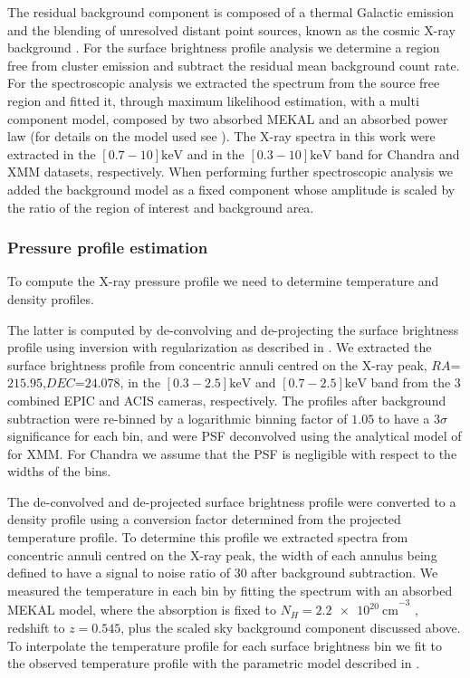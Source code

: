 \documentclass[twocolumn,traditabstract]{aa}
\begin{document}
The residual background component is composed of a thermal Galactic emission \citep{snowden1995} and the blending of unresolved distant point sources, known as the cosmic X-ray background \citep{giacconi2001}. For the surface brightness profile analysis we determine a region free from cluster emission and subtract the residual mean background count rate. For the spectroscopic analysis we extracted the spectrum from the source free region and fitted it, through maximum likelihood estimation, with a multi component model, composed by two absorbed MEKAL and an absorbed power law (for details on the model used see \citealt{pratt2009}). The X-ray spectra in this work were extracted in the $[0.7-10]\si{\kilo\electronvolt}$ and in the $[0.3-10]\si{\kilo\electronvolt}$ band for Chandra and XMM datasets, respectively. When performing further spectroscopic analysis we added the background model as a fixed component whose amplitude is scaled by the ratio of the region of interest and background area.

\subsubsection{Pressure profile estimation}
To compute the X-ray pressure profile we need to determine temperature and density profiles. 

The latter is computed by de-convolving and de-projecting the surface brightness profile using inversion with regularization as described in \cite{croston2006}. We extracted the surface brightness profile from concentric annuli centred on the X-ray peak, $RA$=$215.95$,$DEC$=$24.078$, in the $[0.3-2.5]\si{\kilo\electronvolt}$ and $[0.7-2.5]\si{\kilo\electronvolt}$ band from the $3$ combined EPIC and ACIS cameras, respectively. The profiles after background subtraction were re-binned by a logarithmic binning factor of $1.05$ to have a $3\sigma$ significance for each bin, and were PSF deconvolved using the analytical model of \cite{ghizzardi2001} for XMM. For Chandra we assume that the PSF is negligible with respect to 
the widths of the bins. 

The de-convolved and de-projected surface brightness profile were converted to a density profile using a conversion factor determined from the projected temperature profile. To determine this profile we extracted spectra from concentric annuli centred on the X-ray peak, the width of each annulus being defined to have a signal to noise ratio of $30$ after  background subtraction.  We measured the temperature in each bin by fitting the spectrum with an absorbed MEKAL model, where the absorption is fixed to $N_{H}=\SI{2.2e20}{\centi\meter}^{-3}$ \citep{kalberla2005}, redshift to $z=0.545$, plus the scaled sky background component discussed above. To interpolate the temperature profile for each surface brightness bin we fit to the observed temperature profile with the parametric model described in \cite{vikhlinin2006}. 
\end{document}
